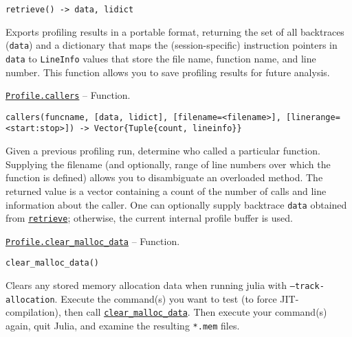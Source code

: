 \begin{adjustwidth}{2em}{0pt}


\begin{verbatim}
retrieve() -> data, lidict
\end{verbatim}

{\textquotedbl}Exports{\textquotedbl} profiling results in a portable format, returning the set of all backtraces (\texttt{data}) and a dictionary that maps the (session-specific) instruction pointers in \texttt{data} to \texttt{LineInfo} values that store the file name, function name, and line number. This function allows you to save profiling results for future analysis.



\end{adjustwidth}
\hypertarget{14497996294492518181}{} 
\hyperlink{14497996294492518181}{\texttt{Profile.callers}}  -- {Function.}

\begin{adjustwidth}{2em}{0pt}


\begin{verbatim}
callers(funcname, [data, lidict], [filename=<filename>], [linerange=<start:stop>]) -> Vector{Tuple{count, lineinfo}}
\end{verbatim}

Given a previous profiling run, determine who called a particular function. Supplying the filename (and optionally, range of line numbers over which the function is defined) allows you to disambiguate an overloaded method. The returned value is a vector containing a count of the number of calls and line information about the caller. One can optionally supply backtrace \texttt{data} obtained from \hyperlink{10202508103131430980}{\texttt{retrieve}}; otherwise, the current internal profile buffer is used.



\end{adjustwidth}
\hypertarget{12697816172521511938}{} 
\hyperlink{12697816172521511938}{\texttt{Profile.clear\_malloc\_data}}  -- {Function.}

\begin{adjustwidth}{2em}{0pt}


\begin{verbatim}
clear_malloc_data()
\end{verbatim}

Clears any stored memory allocation data when running julia with \texttt{--track-allocation}. Execute the command(s) you want to test (to force JIT-compilation), then call \hyperlink{12697816172521511938}{\texttt{clear\_malloc\_data}}. Then execute your command(s) again, quit Julia, and examine the resulting \texttt{*.mem} files.



\end{adjustwidth}

